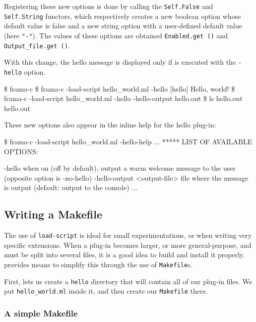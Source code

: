 
Registering these new options is done by calling the \texttt{Self.False} and
\texttt{Self.String} functors, which respectively creates a new boolean option
whose default value is false and a new string option with a user-defined default
value (here \texttt{"-"}). The values of these options are obtained \via
\texttt{Enabled.get ()} and \texttt{Output\_file.get ()}. 

With this change, the hello message is displayed only if \framac is
executed with the \texttt{-hello} option.
\begin{shell}
\$ frama-c
\$ frama-c -load-script hello_world.ml -hello
[hello] Hello, world!
\$ frama-c -load-script hello_world.ml -hello -hello-output hello.out
\$ ls hello.out
hello.out
\end{shell}

These new options also appear in the inline help for the hello plug-in:
\begin{shell}
\$ frama-c -load-script hello_world.ml -hello-help
...
***** LIST OF AVAILABLE OPTIONS:

-hello              when on (off by default), output a warm welcome message
                    to the user (opposite option is -no-hello)
-hello-output <output-file>  file where the message is output (default:
                    output to the console)
...
\end{shell}


\subsection{Writing a Makefile}\label{tut2:basic-makefile}

The use of \texttt{load-script} is ideal for small experimentations,
or when writing very specific extensions. When a plug-in becomes larger,
or more general-purpose, and must be split into several files, it is a
good idea to build and install it properly. \framac provides means to
simplify this through the use of \texttt{Makefile}s.

First, lets us create a \texttt{hello} directory that will contain all
of our plug-in files. We put \verb+hello_world.ml+ inside it, and then
create our \texttt{Makefile} there.

\subsubsection*{A simple Makefile}

